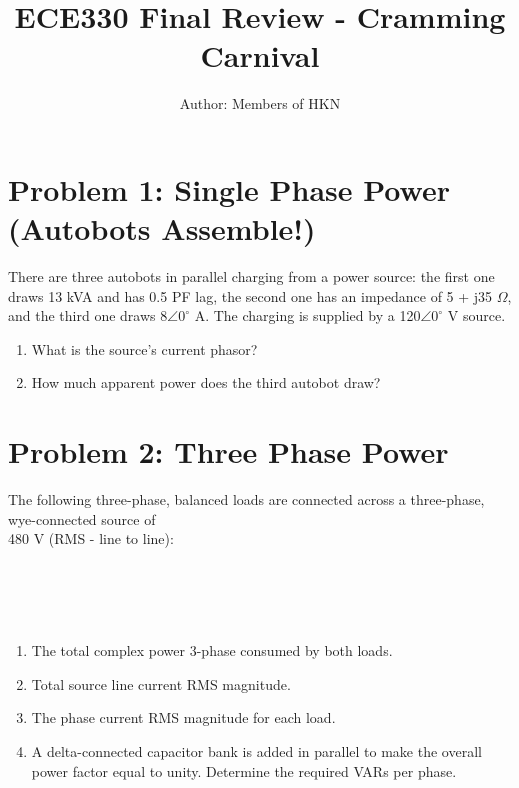\documentclass{article}
\title{ECE330 Final Review - Cramming Carnival}
\author{Author: Members of HKN}
\date{}
\begin{document}
\maketitle


\noindent
\section*{Problem 1: Single Phase Power (Autobots Assemble!)} %
There are three autobots in parallel charging from a power source: the first one draws 13 kVA and has 0.5 PF lag, the second one has an impedance of 5 + j35 $\Omega$, and the third one draws 8$\angle 0^{\circ}$ A. The charging is supplied by a 120$\angle 0^{\circ}$ V source.
\begin{enumerate}[label=(\alph*)]
    \item {What is the source's current phasor?}
    \item {How much apparent power does the third autobot draw?}
\end{enumerate}

\newpage %
\noindent
\section*{Problem 2: Three Phase Power}
The following three-phase, balanced loads are connected across a three-phase, wye-connected source of \\ 480 V (RMS - line to line):   \\ \\ 
 \\
\\ \\ 
\begin{enumerate}[label=(\alph*)]
    \item {The total complex power 3-phase consumed by both loads. }
    \item {Total source line current RMS magnitude.}
    \item {The phase current RMS magnitude for each load.}
    \item {A delta-connected capacitor bank is added in parallel to make the overall power factor equal to unity. Determine the required VARs per phase.}
\end{enumerate}

\newpage %
\noindent 
\end{document}
